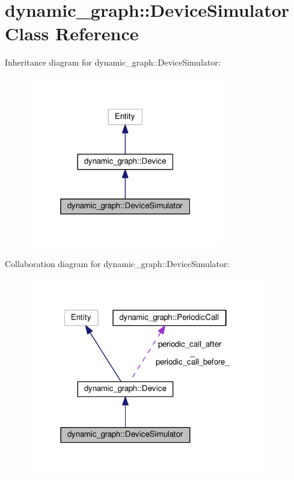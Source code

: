 \hypertarget{classdynamic__graph_1_1DeviceSimulator}{}\section{dynamic\+\_\+graph\+:\+:Device\+Simulator Class Reference}
\label{classdynamic__graph_1_1DeviceSimulator}


Inheritance diagram for dynamic\+\_\+graph\+:\+:Device\+Simulator\+:
\nopagebreak
\begin{figure}[H]
\begin{center}
\leavevmode
\includegraphics[width=241pt]{classdynamic__graph_1_1DeviceSimulator__inherit__graph}
\end{center}
\end{figure}


Collaboration diagram for dynamic\+\_\+graph\+:\+:Device\+Simulator\+:
\nopagebreak
\begin{figure}[H]
\begin{center}
\leavevmode
\includegraphics[width=291pt]{classdynamic__graph_1_1DeviceSimulator__coll__graph}
\end{center}
\end{figure}
